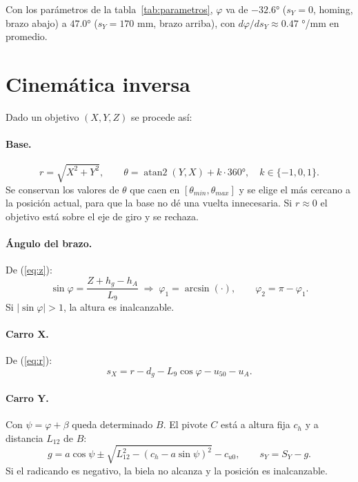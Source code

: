 \documentclass[a4paper,12pt]{article}
\begin{document}
Con los parámetros de la tabla~\ref{tab:parametros}, $\varphi$ va de $-32.6°$ ($s_Y=0$, homing, brazo abajo) a
$47.0°$ ($s_Y = 170$ mm, brazo arriba), con $d\varphi/ds_Y \approx 0.47$ °/mm en promedio.

\section{Cinemática inversa}

Dado un objetivo $(X, Y, Z)$ se procede así:

\paragraph{Base.}
\begin{equation}
r = \sqrt{X^2+Y^2},\qquad \theta = \operatorname{atan2}(Y,X) + k\cdot 360°,\quad k\in\{-1,0,1\}.
\end{equation}
Se conservan los valores de $\theta$ que caen en $[\theta_{min}, \theta_{max}]$ y se elige el más cercano
a la posición actual, para que la base no dé una vuelta innecesaria. Si $r \approx 0$ el objetivo está
sobre el eje de giro y se rechaza.

\paragraph{Ángulo del brazo.} De (\ref{eq:z}):
\begin{equation}
\sin\varphi = \frac{Z + h_g - h_A}{L_9}\;\Rightarrow\;
\varphi_1 = \arcsin(\cdot),\qquad \varphi_2 = \pi - \varphi_1 .
\end{equation}
Si $|\sin\varphi| > 1$, la altura es inalcanzable.

\paragraph{Carro X.} De (\ref{eq:r}):
\begin{equation}
s_X = r - d_g - L_9\cos\varphi - u_{50} - u_A .
\end{equation}

\paragraph{Carro Y.} Con $\psi = \varphi + \beta$ queda determinado $B$. El pivote $C$ está a altura
fija $c_h$ y a distancia $L_{12}$ de $B$:
\begin{equation}
g = a\cos\psi \pm \sqrt{L_{12}^2 - \left(c_h - a\sin\psi\right)^2} - c_{u0},\qquad s_Y = S_Y - g .
\end{equation}
Si el radicando es negativo, la biela no alcanza y la posición es inalcanzable.
\end{document}
